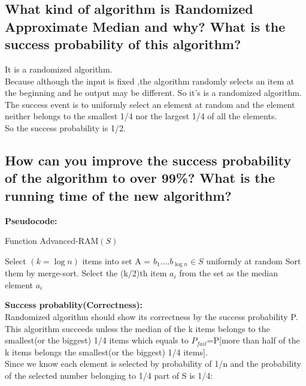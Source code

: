 \documentclass{article}
\begin{document}
\subsection{What kind of algorithm is Randomized Approximate Median and why? What is the success probability of this algorithm?}
It is a randomized algorithm.\\
Because although the input is fixed ,the algorithm randomly selects an item at the beginning and he output may be different. So it's is a randomized algorithm.\\
The success event is to uniformly select an element at random and the element neither belongs to the smallest 1/4 nor the largest 1/4 of all the elements. \\
So the success probability is 1/2. 
\subsection{How can you improve the success probability of the algorithm to over 99\%? What is the
running time of the new algorithm?}
\textbf{\large Pseudocode:}
\begin{algorithm}[H]
  \caption{Function Advanced-RAM$(S)$}
  \label{alg1}
  \begin{algorithmic}
  \STATE Select $(k=\log n)$ items into set A = $b_1....b_{\log n}\in S$ uniformly at random 
  \STATE Sort them by merge-sort.
  \STATE Select the (k/2)th item $a_i$ from the set as the median element
  \RETURN $a_i$
  \end{algorithmic}
\end{algorithm}
\noindent\textbf{\large Success probablity(Correctness):}\\
Randomized algorithm should show its correctness by the success probability P.\\
This algorithm succeeds unless the median of the k items belongs to the smallest(or the biggest) 1/4 items which equals to $P_{fail}$=P[more than half of the k items belongs the smallest(or the biggest) 1/4 items].\\
Since we know each element is selected by probability of 1/n and the probability of the selected number belonging to 1/4 part of S is 1/4: \\
\end{document}
